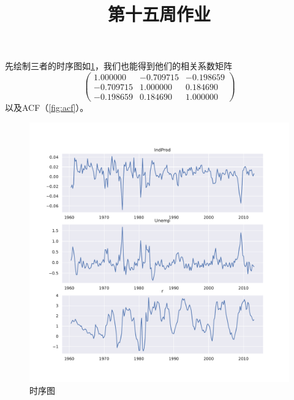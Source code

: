 \documentclass[cn]{homework}
\title{第十五周作业}
\begin{document}
    \maketitle

    \problem
    先绘制三者的时序图如\cref{fig:trend}，我们也能得到他们的相关系数矩阵
    \[\begin{pmatrix}
        1.000000  & -0.709715 & -0.198659\\
        -0.709715 & 1.000000 & 0.184690\\
        -0.198659 & 0.184690 & 1.000000
    \end{pmatrix}\]
    以及ACF（\cref{fig:acf}）。

    \begin{figure}[h]
        \centering
        \includegraphics[width=\textwidth]{trend}
        \caption{时序图}
        \label{fig:trend}
    \end{figure}
\end{document}
